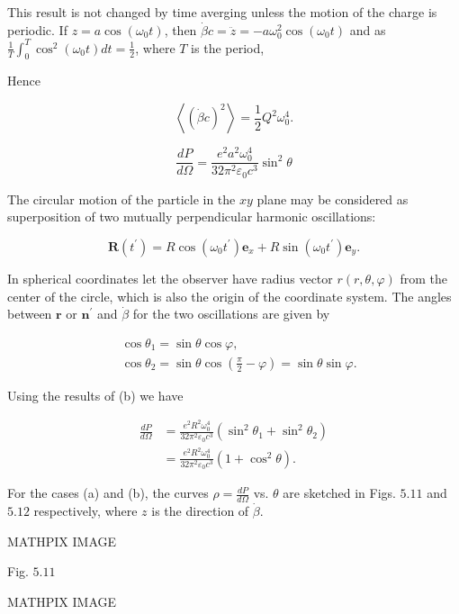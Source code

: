 \documentclass[10pt]{article}
\begin{document}
This result is not changed by time averging unless the motion of the charge is periodic.
 If $z=a \cos \left(\omega_{0} t\right)$, then $\dot{\beta} c=\ddot{z}=-a \omega_{0}^{2} \cos \left(\omega_{0} t\right)$ and as $\frac{1}{T} \int_{0}^{T} \cos ^{2}\left(\omega_{0} t\right) d t=\frac{1}{2}$, where $T$ is the period,

Hence

$$
\left\langle(\dot{\beta} c)^{2}\right\rangle=\frac{1}{2} Q^{2} \omega_{0}^{4} .
$$

$$
\frac{d P}{d \Omega}=\frac{e^{2} a^{2} \omega_{0}^{4}}{32 \pi^{2} \varepsilon_{0} c^{3}} \sin ^{2} \theta
$$

 The circular motion of the particle in the $x y$ plane may be considered as superposition of two mutually perpendicular harmonic oscillations:

$$
\mathbf{R}\left(t^{\prime}\right)=R \cos \left(\omega_{0} t^{\prime}\right) \mathbf{e}_{x}+R \sin \left(\omega_{0} t^{\prime}\right) \mathbf{e}_{y} .
$$

In spherical coordinates let the observer have radius vector $r(r, \theta, \varphi)$ from the center of the circle, which is also the origin of the coordinate system. The angles between $\mathbf{r}$ or $\mathbf{n}^{\prime}$ and $\dot{\beta}$ for the two oscillations are given by

$$
\begin{aligned}
&\cos \theta_{1}=\sin \theta \cos \varphi, \\
&\cos \theta_{2}=\sin \theta \cos \left(\frac{\pi}{2}-\varphi\right)=\sin \theta \sin \varphi .
\end{aligned}
$$

Using the results of (b) we have

$$
\begin{aligned}
\frac{d P}{d \Omega} &=\frac{e^{2} R^{2} \omega_{0}^{4}}{32 \pi^{2} \varepsilon_{0} c^{3}}\left(\sin ^{2} \theta_{1}+\sin ^{2} \theta_{2}\right) \\
&=\frac{e^{2} R^{2} \omega_{0}^{4}}{32 \pi^{2} \varepsilon_{0} c^{3}}\left(1+\cos ^{2} \theta\right) .
\end{aligned}
$$

 For the cases (a) and (b), the curves $\rho=\frac{d P}{d \Omega}$ vs. $\theta$ are sketched in Figs. $5.11$ and $5.12$ respectively, where $z$ is the direction of $\dot{\beta}$.

MATHPIX IMAGE

Fig. $5.11$ 

MATHPIX IMAGE
\end{document}
